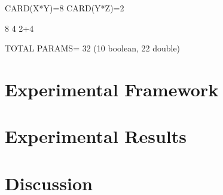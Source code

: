 CARD(X*Y)=8
CARD(Y*Z)=2

8
4
2+4	

TOTAL PARAMS= 32 (10 boolean, 22 double)

\section{Experimental Framework}
\label{sec:chp3-experimental}

\section{Experimental Results}
\label{sec:chp3-results}

\section{Discussion}
\label{sec:chp3-discussion}

